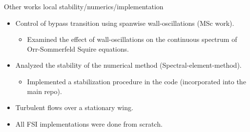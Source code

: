 \begin{frame}[t]{Other works}
	{local stability/numerics/implementation}	
	
	\begin{itemize}
		\item <1-> Control of bypass transition using spanwise wall-oscillations (MSc work).
		\begin{itemize}
			\item <1-> Examined the effect of wall-oscillations on the continuous spectrum of Orr-Sommerfeld Squire equations.
		\end{itemize}
		\item <2-> Analyzed the stability of the numerical method (Spectral-element-method).
		\begin{itemize}
			\item <2-> Implemented a stabilization procedure in the code (incorporated into the main repo).
		\end{itemize}
		\item <3-> Turbulent flows over a stationary wing. 
		\item <4-> All FSI implementations were done from scratch.
	\end{itemize}
	
	
	
\end{frame}
